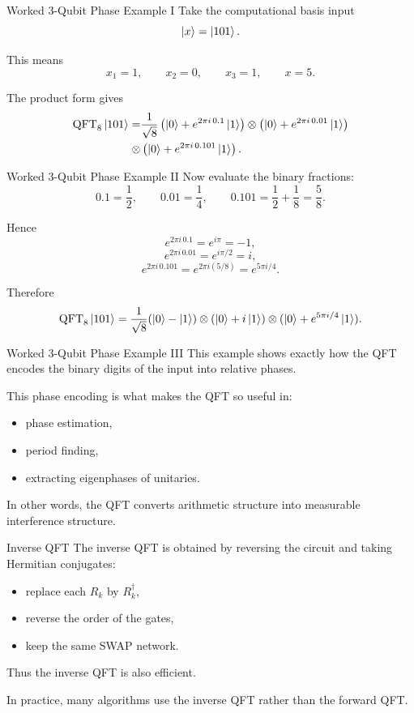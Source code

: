 \documentclass{beamer}
\begin{document}
\begin{frame}{Worked 3-Qubit Phase Example I}
Take the computational basis input
\[
\ket{x}=\ket{101}.
\]

This means
\[
x_1=1,\qquad x_2=0,\qquad x_3=1,
\qquad x=5.
\]

The product form gives
\begin{align*}
\operatorname{QFT}_8 \ket{101}
= &
\frac{1}{\sqrt8}
\left(\ket0 + e^{2\pi i\,0.1}\ket1\right)
\otimes
\left(\ket0 + e^{2\pi i\,0.01}\ket1\right) \\
\otimes &
\left(\ket0 + e^{2\pi i\,0.101}\ket1\right).
\end{align*}
\end{frame}

\begin{frame}{Worked 3-Qubit Phase Example II}
Now evaluate the binary fractions:
\[
0.1 = \frac12,
\qquad
0.01 = \frac14,
\qquad
0.101 = \frac12 + \frac18 = \frac58.
\]

Hence
\[
e^{2\pi i\,0.1} = e^{i\pi} = -1,
\]
\[
e^{2\pi i\,0.01} = e^{i\pi/2} = i,
\]
\[
e^{2\pi i\,0.101} = e^{2\pi i(5/8)} = e^{5\pi i/4}.
\]

Therefore
\[
\operatorname{QFT}_8 \ket{101}
=
\frac{1}{\sqrt8}
(\ket0-\ket1)\otimes(\ket0+i\ket1)\otimes(\ket0+e^{5\pi i/4}\ket1).
\]
\end{frame}

\begin{frame}{Worked 3-Qubit Phase Example III}
This example shows exactly how the QFT encodes the binary digits of the input into relative phases.

This phase encoding is what makes the QFT so useful in:
\begin{itemize}
\item phase estimation,
\item period finding,
\item extracting eigenphases of unitaries.
\end{itemize}

In other words, the QFT converts arithmetic structure into measurable interference structure.
\end{frame}

\begin{frame}{Inverse QFT}
The inverse QFT is obtained by reversing the circuit and taking Hermitian conjugates:
\begin{itemize}
\item replace each \(R_k\) by \(R_k^\dagger\),
\item reverse the order of the gates,
\item keep the same SWAP network.
\end{itemize}

Thus the inverse QFT is also efficient.

In practice, many algorithms use the inverse QFT rather than the forward QFT.
\end{frame}
\end{document}
